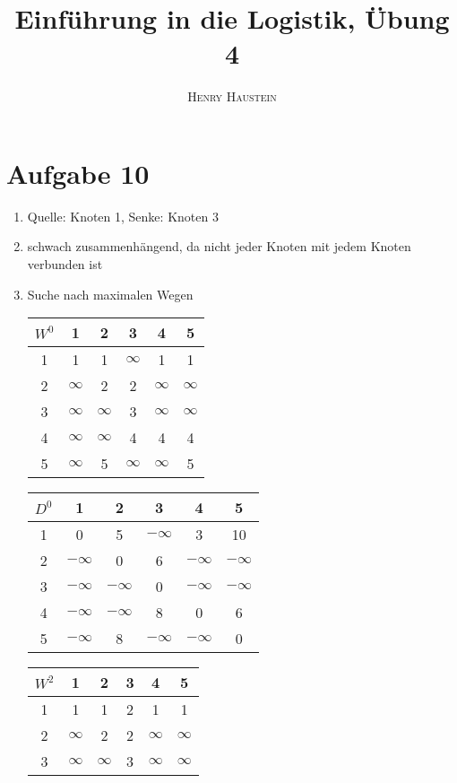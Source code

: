 \documentclass{article}
\title{\textbf{Einführung in die Logistik, Übung 4}}
\author{\textsc{Henry Haustein}}
\date{}
\begin{document}
	\maketitle
	
	\section*{Aufgabe 10}
	\begin{enumerate}[label=(\alph*)]
		\item Quelle: Knoten 1, Senke: Knoten 3
		\item schwach zusammenhängend, da nicht jeder Knoten mit jedem Knoten verbunden ist
		\item Suche nach maximalen Wegen
		\begin{center}
			\begin{tabular}{c|ccccc}
				$W^0$ & 1 & 2 & 3 & 4 & 5 \\
				\hline
				1 & 1 & 1 & $\infty$ & 1 & 1 \\
				2 & $\infty$ & 2 & 2 & $\infty$ & $\infty$ \\
				3 & $\infty$ & $\infty$ & 3 & $\infty$ & $\infty$ \\
				4 & $\infty$ & $\infty$ & 4 & 4 & 4 \\
				5 & $\infty$ & 5 & $\infty$ & $\infty$ & 5
			\end{tabular}
			\begin{tabular}{c|ccccc}
				$D^0$ & 1 & 2 & 3 & 4 & 5 \\
				\hline
				1 & 0 & 5 & $-\infty$ & 3 & 10 \\
				2 & $-\infty$ & 0 & 6 & $-\infty$ & $-\infty$ \\
				3 & $-\infty$ & $-\infty$ & 0 & $-\infty$ & $-\infty$ \\
				4 & $-\infty$ & $-\infty$ & 8 & 0 & 6 \\
				5 & $-\infty$ & 8 & $-\infty$ & $-\infty$ & 0
			\end{tabular}
		\end{center}
		\begin{center}
			\begin{tabular}{c|ccccc}
				$W^2$ & 1 & 2 & 3 & 4 & 5 \\
				\hline
				1 & 1 & \cellcolor{blue!20}1 & 2 & 1 & 1 \\
				2 & \cellcolor{blue!20}$\infty$ & \cellcolor{blue!20}2 & \cellcolor{blue!20}2 & \cellcolor{blue!20}$\infty$ & \cellcolor{blue!20}$\infty$ \\
				3 & $\infty$ & \cellcolor{blue!20}$\infty$ & 3 & $\infty$ & $\infty$ \\

\end{tabular}
\end{center}
\end{enumerate}
\end{document}

